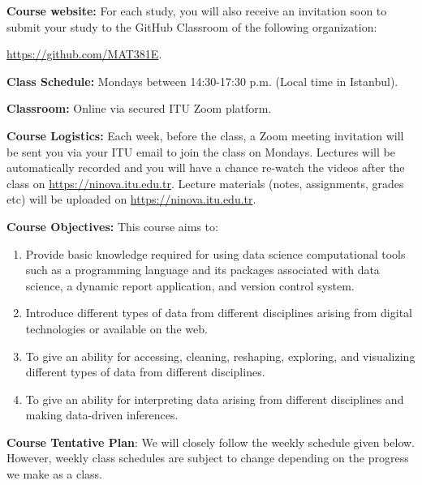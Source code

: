 \documentclass[
  12pt,
]{article}
\providecommand{\tightlist}{%
  \setlength{\itemsep}{0pt}\setlength{\parskip}{0pt}}
\begin{document}
\textbf{Course website:} For each study, you will also receive an
invitation soon to submit your study to the GitHub Classroom of the
following organization:

\url{https://github.com/MAT381E}.

\textbf{Class Schedule:} Mondays between 14:30-17:30 p.m. (Local time in
Istanbul).

\textbf{Classroom:} Online via secured ITU Zoom platform.

\textbf{Course Logistics:} Each week, before the class, a Zoom meeting
invitation will be sent you via your ITU email to join the class on
Mondays. Lectures will be automatically recorded and you will have a
chance re-watch the videos after the class on
\url{https://ninova.itu.edu.tr}. Lecture materials (notes, assignments,
grades etc) will be uploaded on \url{https://ninova.itu.edu.tr}.

\textbf{Course Objectives:} This course aims to:

\begin{enumerate}
\def\labelenumi{\arabic{enumi}.}
\tightlist
\item
  Provide basic knowledge required for using data science computational
  tools such as a programming language and its packages associated with
  data science, a dynamic report application, and version control
  system.
\item
  Introduce different types of data from different disciplines arising
  from digital technologies or available on the web.
\item
  To give an ability for accessing, cleaning, reshaping, exploring, and
  visualizing different types of data from different disciplines.
\item
  To give an ability for interpreting data arising from different
  disciplines and making data-driven inferences.
\end{enumerate}

\textbf{Course Tentative Plan}: We will closely follow the weekly
schedule given below. However, weekly class schedules are subject to
change depending on the progress we make as a class.
\end{document}
